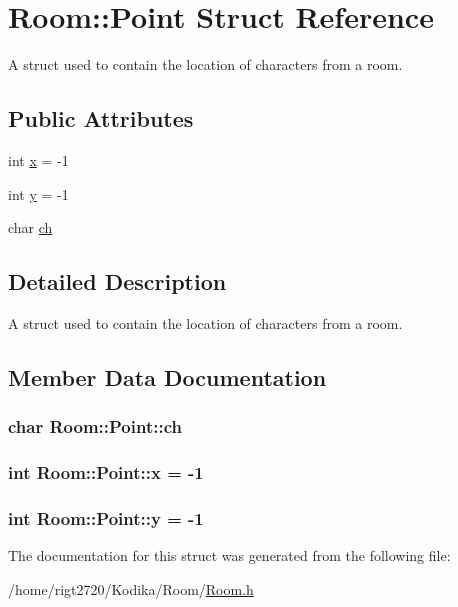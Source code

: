 \hypertarget{structRoom_1_1Point}{\section{Room\-:\-:Point Struct Reference}
\label{structRoom_1_1Point}
}


A struct used to contain the location of characters from a room.  


\subsection*{Public Attributes}
\begin{DoxyCompactItemize}
\item 
int \hyperlink{structRoom_1_1Point_acad019753cb67182b5372525e510a389}{x} = -\/1
\item 
int \hyperlink{structRoom_1_1Point_acc33ccc063a15e925a489b72fffa19fa}{y} = -\/1
\item 
char \hyperlink{structRoom_1_1Point_aa27da949fd69ddedd3b9a2c3e20626dc}{ch}
\end{DoxyCompactItemize}


\subsection{Detailed Description}
A struct used to contain the location of characters from a room. 

\subsection{Member Data Documentation}
\hypertarget{structRoom_1_1Point_aa27da949fd69ddedd3b9a2c3e20626dc}{
\subsubsection[{ch}]{\setlength{\rightskip}{0pt plus 5cm}char Room\-::\-Point\-::ch}}\label{structRoom_1_1Point_aa27da949fd69ddedd3b9a2c3e20626dc}
\hypertarget{structRoom_1_1Point_acad019753cb67182b5372525e510a389}{
\subsubsection[{x}]{\setlength{\rightskip}{0pt plus 5cm}int Room\-::\-Point\-::x = -\/1}}\label{structRoom_1_1Point_acad019753cb67182b5372525e510a389}
\hypertarget{structRoom_1_1Point_acc33ccc063a15e925a489b72fffa19fa}{
\subsubsection[{y}]{\setlength{\rightskip}{0pt plus 5cm}int Room\-::\-Point\-::y = -\/1}}\label{structRoom_1_1Point_acc33ccc063a15e925a489b72fffa19fa}


The documentation for this struct was generated from the following file\-:\begin{DoxyCompactItemize}
\item 
/home/rigt2720/\-Kodika/\-Room/\hyperlink{Room_8h}{Room.\-h}\end{DoxyCompactItemize}
